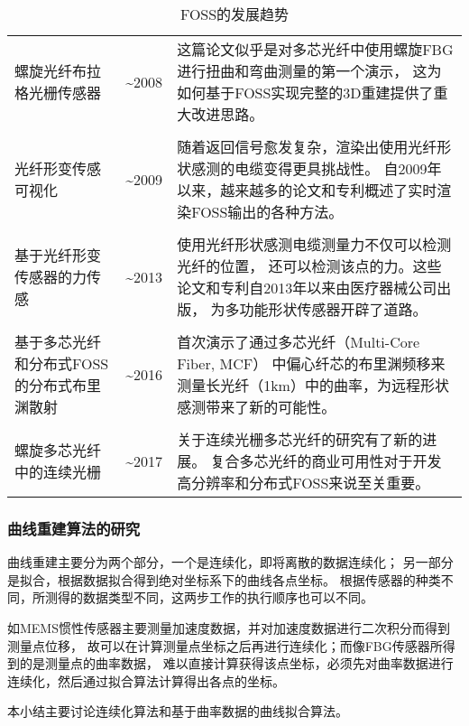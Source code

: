 \begin{table}[!htbp]
\begin{center}
\begin{tabular}{p{}cp{}}
\\
螺旋光纤布拉格光栅传感器 & \textasciitilde 2008 & 这篇论文似乎是对多芯光纤中使用螺旋FBG进行扭曲和弯曲测量的第一个演示，
这为如何基于FOSS实现完整的3D重建提供了重大改进思路。
\\
\\
光纤形变传感可视化 & \textasciitilde 2009 & 随着返回信号愈发复杂，渲染出使用光纤形状感测的电缆变得更具挑战性。
自2009年以来，越来越多的论文和专利概述了实时渲染FOSS输出的各种方法。
\\
\\
基于光纤形变传感器的力传感 & \textasciitilde 2013 & 使用光纤形状感测电缆测量力不仅可以检测光纤的位置，
还可以检测该点的力。这些论文和专利自2013年以来由医疗器械公司出版，
为多功能形状传感器开辟了道路。
\\
\\
基于多芯光纤和分布式FOSS的分布式布里渊散射 & \textasciitilde 2016 & 首次演示了通过多芯光纤（Multi-Core Fiber, MCF）
中偏心纤芯的布里渊频移来测量长光纤（1km）中的曲率，为远程形状感测带来了新的可能性。
\\
\\
螺旋多芯光纤中的连续光栅 & \textasciitilde 2017 & 关于连续光栅多芯光纤的研究有了新的进展。
复合多芯光纤的商业可用性对于开发高分辨率和分布式FOSS来说至关重要。
\\
\bottomrule
\end{tabular}
\end{center}
\caption{FOSS的发展趋势}
\label{table:foss}
\end{table}

\subsubsection{曲线重建算法的研究}
曲线重建主要分为两个部分，一个是连续化，即将离散的数据连续化；
另一部分是拟合，根据数据拟合得到绝对坐标系下的曲线各点坐标。
根据传感器的种类不同，所测得的数据类型不同，这两步工作的执行顺序也可以不同。

如MEMS惯性传感器主要测量加速度数据，并对加速度数据进行二次积分而得到测量点位移，
故可以在计算测量点坐标之后再进行连续化；而像FBG传感器所得到的是测量点的曲率数据，
难以直接计算获得该点坐标，必须先对曲率数据进行连续化，然后通过拟合算法计算得出各点的坐标。

本小结主要讨论连续化算法和基于曲率数据的曲线拟合算法。

